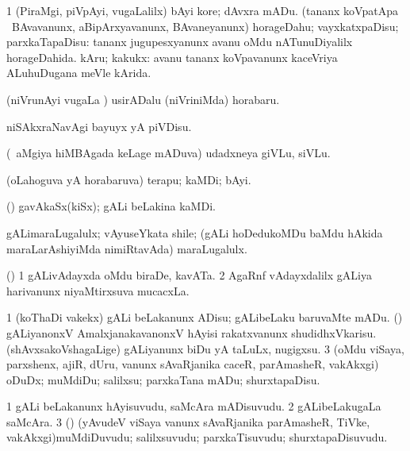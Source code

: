 \bentry
{} 
\gl{\sakirx}
\expl{}
\bmng
\bnum
\num{1} (PiraMgi, piVpAyi, \mo vugaLalilx) bAyi kore; dAvxra mADu. 
 (tananx koVpatApa \mo\ BAvavanunx, aBipArxyavanunx, BAvaneyanunx) 
\banum
{} horageDahu; vayxkatxpaDisu; parxkaTapaDisu:  tananx jugupesxyanunx avanu oMdu nATunuDiyalilx horageDahida. 
 kAru; kakukx:  avanu tananx koVpavanunx kaceVriya ALuhuDugana meVle kArida. 
\eanum
\numie
\enum
\emng

\noindent 
\gl{\akirx}
\expl{}
\bmng
 (niVrunAyi \mo vugaLa \vi) usirADalu (niVriniMda) horabaru. 
\emng

\noindent 
\gl{\pagu}
\expl{}
\bmng
  niSAkxraNavAgi bayuyx yA piVDisu. 
\emng
\eentry

\bentry
{} 
\gl{\nA}
\expl{}
\bmng
 (\kanmu\ aMgiya hiMBAgada keLage mADuva) udadxneya giVLu, siVLu. 
\emng
\eentry

\bentry
{} 
\gl{\nA}
\expl{}
\bmng
 (oLahoguva yA horabaruva) terapu; kaMDi; bAyi. 
\emng
\eentry

\bentry
{} 
\gl{\nA}
\expl{}
\bmng
 (\vAshi) gavAkaSx(kiSx); gALi beLakina kaMDi. 
\emng
\eentry

\bentry
{} 
\gl{\nA}
\expl{}
\bmng
 gALimaraLugalulx; vAyuseYkata shile; (gALi hoDedukoMDu baMdu hAkida maraLarAshiyiMda nimiRtavAda) maraLugalulx. 
\emng
\eentry

\bentry
{} 
\gl{\nA}
\expl{}
\bmng
 (\saM) 
\bnum
\num{1} gALivAdayxda oMdu biraDe, kavATa. 
\num{2} AgaRnf vAdayxdalilx gALiya harivanunx niyaMtirxsuva mucacxLa. 
\enum
\emng
\eentry

\bentry
{} 
\gl{\sakirx}
\expl{}
\bmng
\bnum
\num{1} (koThaDi \mo vakekx) gALi beLakanunx ADisu; gALibeLaku baruvaMte mADu. 
 (\veYshA) 
\banum
{} gALiyanonxV AmalxjanakavanonxV hAyisi rakatxvanunx shudidhxVkarisu. 
 (shAvxsakoVshagaLige) gALiyanunx biDu yA taLuLx, nugigxsu. 
\eanum
\numie
\num{3} (oMdu viSaya, parxshenx, ajiR, dUru, \mo vanunx sAvaRjanika caceR, parAmasheR, \mo vakAkxgi) oDuDx; muMdiDu; salilxsu; parxkaTana mADu; shurxtapaDisu. 
\enum
\emng
\eentry

\bentry
{} 
\gl{\nA}
\expl{}
\bmng
\bnum
\num{1} gALi beLakanunx hAyisuvudu, saMcAra mADisuvudu. 
\num{2} gALibeLakugaLa saMcAra. 
\num{3} (\rUpa) (yAvudeV viSaya \mo vanunx sAvaRjanika parAmasheR, TiVke, \mo vakAkxgi)muMdiDuvudu; salilxsuvudu; parxkaTisuvudu; shurxtapaDisuvudu. 
\enum
\emng
\eentry

